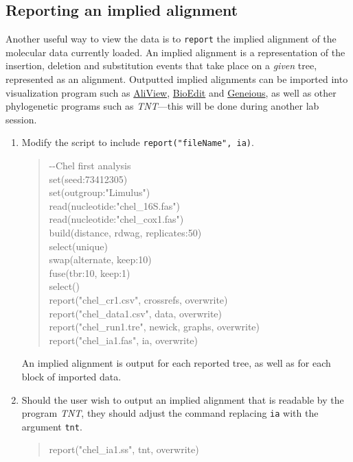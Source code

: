 \documentclass[]{article}
\begin{document}
\subsection{Reporting an implied alignment}
\label{subsec:ia}

Another useful way to view the data is to \texttt{report} the implied alignment of the 
molecular data currently loaded. An implied alignment is a representation of the 
insertion, deletion and substitution events that take place on a \textit{given} tree, 
represented as an alignment. Outputted implied alignments can be imported into 
visualization program such as \href{https://ormbunkar.se/aliview/#DOWNLOAD}{AliView}, 
\href{https://thalljiscience.github.io/}{BioEdit} and \href{https://www.geneious.com}{Geneious}, 
as well as other phylogenetic programs such as \textit{TNT}---this will be done during 
another lab session. 

\begin{enumerate}

\item Modify the script to include \texttt{report("fileName", ia)}.

	\begin{quote}
	-\/-Chel first analysis\\
	set(seed:73412305)\\
	set(outgroup:"Limulus")\\
	read(nucleotide:"chel\_16S.fas")\\
	read(nucleotide:"chel\_cox1.fas")\\
	build(distance, rdwag, replicates:50)\\
	select(unique)\\
	swap(alternate, keep:10)\\
	fuse(tbr:10, keep:1)\\
	select()\\
	report("chel\_cr1.csv", crossrefs, overwrite)\\
	report("chel\_data1.csv", data, overwrite)\\
	report("chel\_run1.tre", newick, graphs, overwrite)\\
	report("chel\_ia1.fas", ia, overwrite)\\
	\end{quote}
	
An implied alignment is output for each reported tree, as well as for each block of imported 
data.

\item Should the user wish to output an implied alignment that is readable by the 
program \textit{TNT}, they should adjust the command  replacing \texttt{ia} with the
argument \texttt{tnt}.

	\begin{quote}
	report("chel\_ia1.ss", tnt, overwrite)\\
	\end{quote}
	
\end{enumerate}
\end{document}

